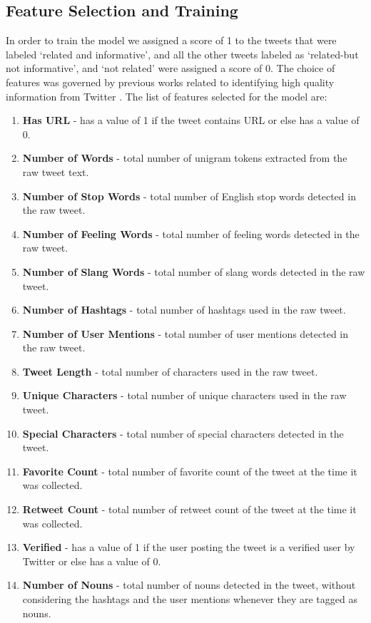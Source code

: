 \subsection{Feature Selection and Training}
In order to train the model we assigned a score of 1 to the tweets that were labeled ‘related and informative’, and all the other tweets labeled as ‘related-but not informative’, and ‘not related’ were assigned a score of 0. The choice of features was governed by previous works related to identifying high quality information from Twitter \cite{castillo2011information,gupta2012credibility,vosecky2012searching,huang2011quality}. The list of features selected for the model are: 
\begin{enumerate}
\item \textbf{Has URL} - has a value of 1 if the tweet contains URL or else has a value of 0.
\item \textbf{Number of Words} - total number of unigram tokens extracted from the raw tweet text.
\item \textbf{Number of Stop Words} - total number of English stop words detected in the raw tweet.
\item \textbf{Number of Feeling Words} - total number of feeling words detected in the raw tweet.
\item \textbf{Number of Slang Words} - total number of slang words detected in the raw tweet.
\item \textbf{Number of Hashtags} - total number of hashtags used in the raw tweet.
\item \textbf{Number of User Mentions} - total number of user mentions detected in the raw tweet.
\item \textbf{Tweet Length} - total number of characters used in the raw tweet.
\item \textbf{Unique Characters} - total number of unique characters used in the raw tweet.
\item \textbf{Special Characters} - total number of special characters detected in the tweet.
\item \textbf{Favorite Count} - total number of favorite count of the tweet at the time it was collected.
\item \textbf{Retweet Count} - total number of retweet count of the tweet at the time it was collected.
\item \textbf{Verified} - has a value of 1 if the user posting the tweet is a verified user by Twitter or else has a value of 0.
\item \textbf{Number of Nouns} - total number of nouns detected in the tweet, without considering the hashtags and the user mentions whenever they are tagged as nouns.

\end{enumerate}
